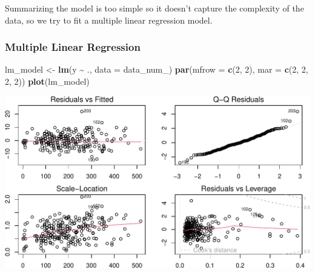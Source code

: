 \documentclass[
]{article}
\newenvironment{Shaded}{\begin{snugshade}}{\end{snugshade}}
\newcommand{\AttributeTok}[1]{\textcolor[rgb]{0.13,0.29,0.53}{#1}}
\newcommand{\DecValTok}[1]{\textcolor[rgb]{0.00,0.00,0.81}{#1}}
\newcommand{\FunctionTok}[1]{\textcolor[rgb]{0.13,0.29,0.53}{\textbf{#1}}}
\newcommand{\NormalTok}[1]{#1}
\newcommand{\OtherTok}[1]{\textcolor[rgb]{0.56,0.35,0.01}{#1}}
\newcommand{\SpecialCharTok}[1]{\textcolor[rgb]{0.81,0.36,0.00}{\textbf{#1}}}
\newcommand{\StringTok}[1]{\textcolor[rgb]{0.31,0.60,0.02}{#1}}
\begin{document}
Summarizing the model is too simple so it doesn't capture the complexity
of the data, so we try to fit a multiple linear regression model.

\subsubsection{Multiple Linear
Regression}\label{multiple-linear-regression}

\begin{Shaded}
\begin{Highlighting}[]
\NormalTok{lm\_model }\OtherTok{\textless{}{-}} \FunctionTok{lm}\NormalTok{(y }\SpecialCharTok{\textasciitilde{}}\NormalTok{ ., }\AttributeTok{data =}\NormalTok{ data\_num\_)}
\FunctionTok{par}\NormalTok{(}\AttributeTok{mfrow =} \FunctionTok{c}\NormalTok{(}\DecValTok{2}\NormalTok{, }\DecValTok{2}\NormalTok{), }\AttributeTok{mar =} \FunctionTok{c}\NormalTok{(}\DecValTok{2}\NormalTok{, }\DecValTok{2}\NormalTok{, }\DecValTok{2}\NormalTok{, }\DecValTok{2}\NormalTok{))}
\FunctionTok{plot}\NormalTok{(lm\_model)}
\end{Highlighting}
\end{Shaded}

\begin{center}\includegraphics{Statistical_Learning_Final_Report_files/figure-latex/linear_regression-1} \end{center}

\begin{Shaded}
\end{Shaded}
\end{document}
